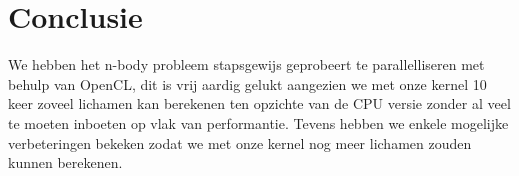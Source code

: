 \documentclass{article}
\begin{document}
\section{Conclusie}

We hebben het n-body probleem stapsgewijs geprobeert te parallelliseren met behulp
van OpenCL, dit is vrij aardig gelukt aangezien we met onze kernel 10 keer zoveel lichamen
kan berekenen ten opzichte van de CPU versie zonder al veel te moeten inboeten op vlak
van performantie. Tevens hebben we enkele mogelijke verbeteringen bekeken zodat we
met onze kernel nog meer lichamen zouden kunnen berekenen.
\end{document}
